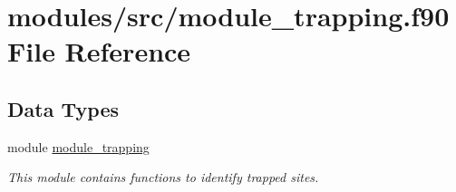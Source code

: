 \hypertarget{module__trapping_8f90}{
\section{modules/src/module\-\_\-trapping.f90 \-File \-Reference}
\label{module__trapping_8f90}
}
\subsection*{\-Data \-Types}
\begin{DoxyCompactItemize}
\item 
module \hyperlink{classmodule__trapping}{module\-\_\-trapping}
\begin{DoxyCompactList}\small\item\em \-This module contains functions to identify trapped sites. \end{DoxyCompactList}\end{DoxyCompactItemize}
